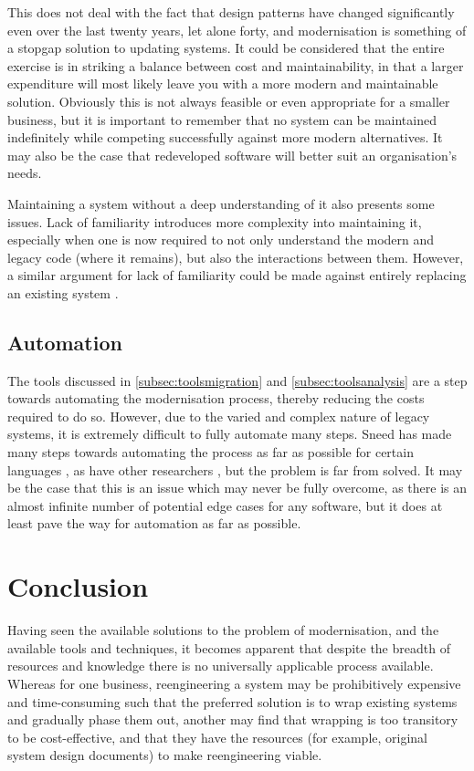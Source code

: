 \documentclass[12pt,journal,compsoc]{IEEEtran}
\begin{document}
This does not deal with the fact that design patterns have changed significantly even over the last twenty years, let alone forty, and modernisation is something of a stopgap solution to updating systems. It could be considered that the entire exercise is in striking a balance between cost and maintainability, in that a larger expenditure will most likely leave you with a more modern and maintainable solution. Obviously this is not always feasible or even appropriate for a smaller business, but it is important to remember that no system can be maintained indefinitely while competing successfully against more modern alternatives. It may also be the case that redeveloped software will better suit an organisation's needs.

Maintaining a system without a deep understanding of it also presents some issues. Lack of familiarity introduces more complexity into maintaining it, especially when one is now required to not only understand the modern and legacy code (where it remains), but also the interactions between them. However, a similar argument for lack of familiarity could be made against entirely replacing an existing system \cite{Almonaies2010}.

\subsection{Automation}
\label{subsec:automation}
The tools discussed in \autoref{subsec:toolsmigration} and \autoref{subsec:toolsanalysis} are a step towards automating the modernisation process, thereby reducing the costs required to do so. However, due to the varied and complex nature of legacy systems, it is extremely difficult to fully automate many steps. Sneed has made many steps towards automating the process as far as possible for certain languages \cite{Sneed2013,Sneed2011,Sneed2008,Sneed2009,Sneed1996,Sneed2001}, as have other researchers \cite{Deursen1998,Aversano2001,Chiang2001,Wu2005,O'Brien2005,Distante2006}, but the problem is far from solved. It may be the case that this is an issue which may never be fully overcome, as there is an almost infinite number of potential edge cases for any software, but it does at least pave the way for automation as far as possible.

\section{Conclusion}
\label{sec:conclusion}
Having seen the available solutions to the problem of modernisation, and the available tools and techniques, it becomes apparent that despite the breadth of resources and knowledge there is no universally applicable process available. Whereas for one business, reengineering a system may be prohibitively expensive and time-consuming such that the preferred solution is to wrap existing systems and gradually phase them out, another may find that wrapping is too transitory to be cost-effective, and that they have the resources (for example, original system design documents) to make reengineering viable.
\end{document}
